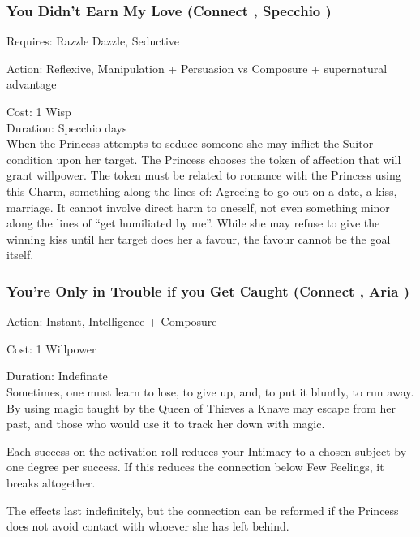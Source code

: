 \subsubsection*{You Didn't Earn My Love (Connect \textbullet\textbullet, Specchio \textbullet\textbullet\textbullet)}

\noindent Requires: Razzle Dazzle, Seductive

\noindent Action: Reflexive, Manipulation + Persuasion vs Composure + supernatural advantage

\noindent Cost: 1 Wisp \\

\noindent Duration: Specchio days \\

\noindent When the Princess attempts to seduce someone she may inflict the Suitor condition upon her target. The Princess chooses the token of affection that will grant willpower. The token must be related to romance with the Princess using this Charm, something along the lines of: Agreeing to go out on a date, a kiss, marriage. It cannot involve direct harm to oneself, not even something minor along the lines of \textquotedblleft get humiliated by me\textquotedblright. While she may refuse to give the winning kiss until her target does her a favour, the favour cannot be the goal itself.

\subsubsection*{You're Only in Trouble if you Get Caught (Connect \textbullet\textbullet, Aria \textbullet\textbullet\textbullet)}

\noindent Action: Instant, Intelligence + Composure 

\noindent Cost: 1 Willpower

\noindent Duration: Indefinate \\

\noindent Sometimes, one must learn to lose, to give up, and, to put it bluntly, to run away. By using magic taught by the Queen of Thieves a Knave may escape from her past, and those who would use it to track her down with magic.

Each success on the activation roll reduces your Intimacy to a chosen subject by one degree per success. If this reduces the connection below Few Feelings, it breaks altogether. 

The effects last indefinitely, but the connection can be reformed if the Princess does not avoid contact with whoever she has left behind. 

